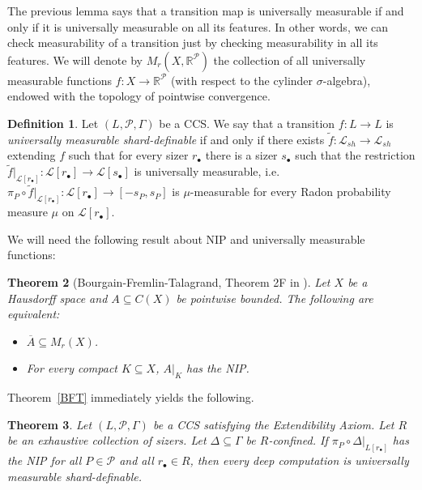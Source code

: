 \documentclass[psamsfonts]{amsart}
\newtheorem{thm}{Theorem}[section]
\theoremstyle{definition}
\newtheorem{defn}[thm]{Definition}
\theoremstyle{remark}
\numberwithin{equation}{section}
\begin{document}
The previous lemma says that a transition map is universally measurable if and only if it is universally measurable on all its features. In other words, we can check measurability of a transition just by checking measurability in all its features. We will denote by $M_r(X,\mathbb{R}^\mathcal{P})$ the collection of all universally measurable functions $f:X\rightarrow\mathbb{R}^\mathcal{P}$ (with respect to the cylinder $\sigma$-algebra), endowed with the topology of pointwise convergence.

\begin{defn}
    Let $(L,\mathcal P,\Gamma)$ be a CCS. We say that a transition $f:L\rightarrow L$ is \emph{universally measurable shard-definable} if and only if there exists $\tilde f:\mathcal{L}_{sh}\rightarrow \mathcal{L}_{sh}$ extending $f$ such that for every sizer $r_\bullet$ there is a sizer $s_\bullet$ such that the restriction $\tilde f|_{\mathcal{L}[r_{\bullet}]}:\mathcal{L}[r_\bullet]\rightarrow\mathcal{L}[s_\bullet]$ is universally measurable, i.e. $\pi_P\circ \tilde f|_{\mathcal{L}[r_{\bullet}]}:\mathcal{L}[r_\bullet]\rightarrow [-s_P,s_P]$ is $\mu$-measurable for every Radon probability measure $\mu$ on $\mathcal{L}[r_\bullet]$.
\end{defn}

We will need the following result about NIP and universally measurable functions:

\begin{thm}[Bourgain-Fremlin-Talagrand, Theorem 2F in \cite{BFT_1978_PCompactBaire}]\label{BFT-2F}
    Let $X$ be a Hausdorff space and $A\subseteq C(X)$ be pointwise bounded. The following are equivalent:
    \begin{itemize}
        \item [(i)] $\overline{A}\subseteq M_r(X)$.
        \item [(ii)] For every compact $K\subseteq X$, $A|_K$ has the NIP.
    \end{itemize}
\end{thm}

Theorem~\ref{BFT} immediately yields the following.

\begin{thm}
    Let $(L,\mathcal P,\Gamma)$ be a CCS satisfying the Extendibility Axiom. Let $R$ be an exhaustive collection of sizers. Let $\Delta\subseteq\Gamma$ be $R$-confined. If $\pi_P\circ\Delta|_{L[r_\bullet]}$ has the NIP for all $P\in\mathcal{P}$ and all $r_{\bullet}\in R$, then every deep computation is universally measurable shard-definable.
\end{thm}
\end{document}
